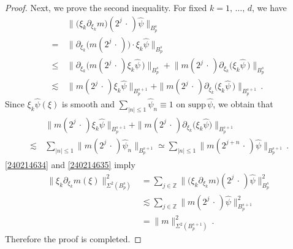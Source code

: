 \documentclass[11pt]{amsart}
\theoremstyle{plain}
\theoremstyle{definition}
\theoremstyle{remark}
\numberwithin{equation}{section}
\newcommand{\bZ}{\mathbb{Z}}
\newcommand{\wh}{\widehat}
\begin{document}
\begin{proof}
Next, we prove the second inequality.
For fixed $k=1,\,\ldots,\,d$, we have 
\begin{align}\label{240214634}
&\big\|\big(\xi_k \partial_{\xi_k} m\big)(2^j\,\cdot\,)\wh{\psi}\big\|_{B_p^s}\nonumber\\
=\,&\big\|\partial_{\xi_k}\big( m(2^j\,\cdot\,)\big) \cdot\xi_k\wh{\psi}\big\|_{B_p^s}\\
\leq\, &\big\|\partial_{\xi_k}\big(m(2^j\,\cdot\,) \xi_k\wh{\psi}\,\big)\big\|_{B_p^{s}}+\big\|m(2^j\,\cdot\,) \partial_{\xi_k}\big(\xi_k\wh{\psi}\,\big)\big\|_{B_p^s} \nonumber\\
\lesssim \,&\|m(2^j\,\cdot\,) \xi_k\wh{\psi}\|_{B_p^{s+1}}+
\|m(2^j\,\cdot\,) \partial_{\xi_k}\big(\xi_k\wh{\psi}\,\big)\|_{B_p^{s+1}}\,.\nonumber
\end{align}
Since $\xi_k\wh{\psi}(\xi)$ is smooth and $\sum_{|n|\leq 1}\wh{\psi}_{n}\equiv 1$ on $\mathrm{supp}\, \wh{\psi}$, we obtain that
\begin{align}\label{240214635}
\begin{split}
&\|m(2^j\,\cdot\,) \xi_k\wh{\psi}\|_{B_p^{s+1}}+
\|m(2^j\,\cdot\,) \partial_{\xi_k} \big(\xi_k\wh{\psi}\big)\|_{B_p^{s+1}} \\
\lesssim \,&\sum_{|n|\leq 1}\|m(2^j\,\cdot\,) \wh{\psi}_n\|_{B_p^{s+1}}\simeq \sum_{|n|\leq 1}\|m(2^{j+n}\,\cdot\,) \wh{\psi}\|_{B_p^{s+1}}\,.
\end{split}
\end{align}
\eqref{240214634} and \eqref{240214635} imply
\begin{align*}
\|\xi_k\partial_{\xi_k} m(\xi)\|_{\Sigma^2(B_p^{s})}^2&=\sum_{j\in\bZ}\|\big(\xi_k\partial_{\xi_k} m\big)(2^j\,\cdot\,)\wh{\psi}\|_{B_p^{s}}^2\\
&\lesssim \sum_{j\in\bZ}\|m(2^j\,\cdot\,)\wh{\psi}\|_{B_p^{s+1}}^2\\
&=\|m\|_{\Sigma^2(B_p^{s+1})}^2\,.
\end{align*}
Therefore the proof is completed.
\end{proof}
\end{document}
